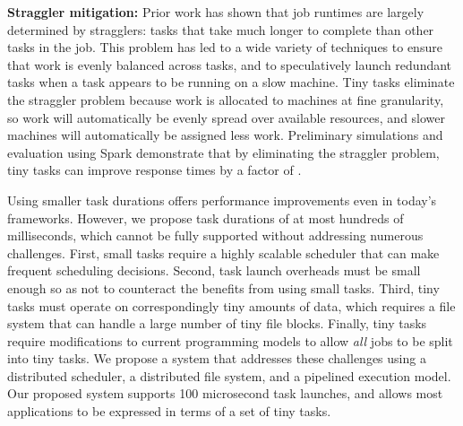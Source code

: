 \vspace{4pt}\noindent\textbf{Straggler mitigation:}
Prior work has shown that job runtimes are largely determined by
stragglers: tasks that take much longer to complete than other tasks in the
job. This problem has led to a wide variety of techniques to ensure that
work is evenly balanced across tasks, and to speculatively launch
redundant tasks when a task appears to be running on a slow machine.
Tiny tasks eliminate the straggler problem because work is allocated to
machines at fine granularity, so work will automatically be evenly spread
over available resources, and slower machines will automatically be assigned
less work. Preliminary simulations and evaluation using Spark demonstrate
that by eliminating the straggler problem, tiny tasks can improve response
times by a factor of .


Using smaller task durations offers performance improvements even in
today's frameworks.  However, we propose task durations of at most
hundreds of milliseconds, which cannot be fully supported without addressing
numerous challenges. First, small tasks require a highly scalable scheduler
that can make frequent scheduling decisions. Second,
task launch overheads must be small enough so as not to counteract the
benefits from using small tasks.
Third, tiny tasks must operate on correspondingly tiny amounts
of data, which requires a file system that can handle a large number of tiny
file blocks. Finally, tiny tasks require modifications to current programming
models to allow \emph{all} jobs to be split into tiny tasks. We propose a system
that addresses these challenges using a distributed scheduler, a distributed
file system, and a pipelined execution model. Our proposed system supports
100 microsecond task launches, and allows most applications to be
expressed in terms of a set of tiny tasks.

